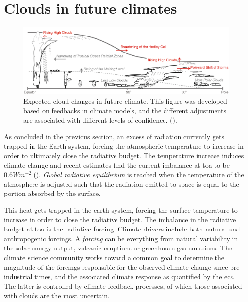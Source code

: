\section{Clouds in future climates} \label{sec:intro_cloud_future_climates}
\begin{figure}[h]
    \centering
    \includegraphics[scale = 0.8]{Chapter1_Intro/images/Fig7-11_ipcc.jpg}
    \caption{Expected cloud changes in future climate. This figure was developed based on feedbacks in climate models, and the different adjustments are associated with different levels of confidence.  (\cite{IPCC_CH7_clouds}).}
    \label{fig:cloud_scheme}
\end{figure}
As concluded in the previous section, an excess of radiation currently gets trapped in the Earth system, forcing the atmospheric temperature to increase in order to ultimately close the radiative budget. The temperature increase induces climate change and recent estimates find the current imbalance at \acrshort{toa} to be $0.6 Wm^{-2}$ (\cite{Wild2019TheModels}).  \textit{Global radiative equilibrium} is reached when the temperature of the atmosphere is adjusted such that the radiation emitted to space is equal to the portion absorbed by the surface.


This heat gets trapped in the earth system, forcing the surface temperature to increase in order to close the radiative budget. The imbalance in the radiative budget at \acrfull{toa} is the radiative forcing. 
Climate drivers include both natural and anthropogenic forcings. A \textit{forcing} can be everything from natural variability in the solar energy output, volcanic eruptions or greenhouse gas emissions. The climate science community works toward a common goal to determine the magnitude of the forcings responsible for the observed climate change since pre-industrial times, and the associated climate response as quantified by the \acrshort{ecs}. The latter is controlled by climate feedback processes, of which those associated with clouds are the most uncertain. %

